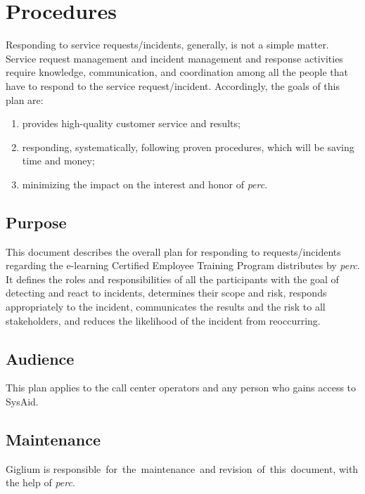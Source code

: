 \clearpage
\section{Procedures}\label{procedures}
Responding to service requests/incidents, generally, is not a simple matter. Service request management and incident management and response activities require knowledge, communication, and coordination among all the people that have to
respond to the service request/incident. Accordingly, the goals of this plan are:
\begin{enumerate}
	\item provides high-quality customer service and results;
	\item responding, systematically, following proven procedures, which will be saving time and money;
	\item minimizing the impact on the interest and honor of \textit{\gls{perc}}.
\end{enumerate}

\subsection{Purpose}\label{purpose}	
This document describes the	overall plan for responding to requests/incidents regarding the e-learning Certified Employee Training Program distributes by \textit{\gls{perc}}. It defines the roles and responsibilities of all the participants with the goal of detecting and react to incidents, determines their scope and risk, responds appropriately to the incident, communicates the results and the risk to all stakeholders, and reduces the likelihood of the incident from reoccurring.

\subsection{Audience}	
  
This plan applies to the call center operators and any person who gains access to SysAid.	
  	
\subsection{Maintenance}  
Giglium is responsible for the maintenance and revision of this document, with the help of \textit{\gls{perc}}.

